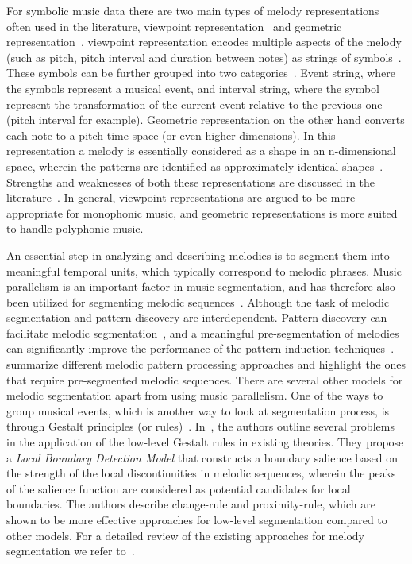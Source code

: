 For symbolic music data there are two main types of melody representations often used in the literature, viewpoint representation~\citep{conklin1995multiple} and geometric representation~\citep{meredith2002algorithms}. viewpoint representation encodes multiple aspects of the melody (such as pitch, pitch interval and duration between notes) as strings of symbols~\citep{conklin2001representation}. These symbols can be further grouped into two categories~\citep{meredith2002algorithms}. Event string, where the symbols represent a musical event, and interval string, where the symbol represent the transformation of the current event relative to the previous one (pitch interval for example). Geometric representation on the other hand converts each note to a pitch-time space (or even higher-dimensions). In this representation a melody is essentially considered as a shape in an n-dimensional space, wherein the patterns are identified as approximately identical shapes~\citep{meredith2002algorithms}. Strengths and weaknesses of both these representations are discussed in the literature~\cite{Cambouropoulos2009,meredith2002algorithms}. In general, viewpoint representations are argued to be more appropriate for monophonic music, and geometric representations is more suited to handle polyphonic music. 

An essential step in analyzing and describing melodies is to segment them into meaningful temporal units, which typically correspond to melodic phrases. Music parallelism is an important factor in music segmentation, and has therefore also been utilized for segmenting melodic sequences~\citep{Cambouropoulos2006}. Although the task of melodic segmentation and pattern discovery are interdependent. Pattern discovery can facilitate melodic segmentation~\citep{Cambouropoulos2006}, and a meaningful pre-segmentation of melodies can significantly improve the performance of the pattern induction techniques~\citep{hiraga1997structural}. \cite{cambouropoulos2001pattern} summarize different melodic pattern processing approaches and highlight the ones that require pre-segmented melodic sequences. There are several other models for melodic segmentation apart from using music parallelism. One of the ways to group musical events, which is another way to look at segmentation process, is through Gestalt principles (or rules)~\citep{Lerdahl1983,tenney1980temporal}. In~\cite{cambouropoulos1996formal,cambouropoulos2001local}, the authors outline several problems in the application of the low-level Gestalt rules in existing theories. They propose a \textit{Local Boundary Detection Model} that constructs a boundary salience based on the strength of the local discontinuities in melodic sequences, wherein the peaks of the salience function are considered as potential candidates for local boundaries. The authors describe change-rule and proximity-rule, which are shown to be more effective approaches for low-level segmentation compared to other models. For a detailed review of the existing approaches for melody segmentation we refer to~\cite{cambouropoulos2001pattern}.


